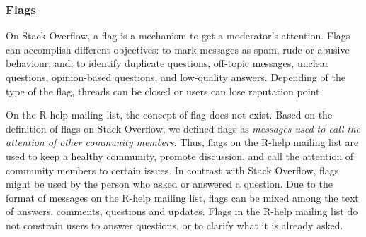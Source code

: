 \documentclass{sig-alternate-05-2015}
\begin{document}

\subsubsection{Flags}

	On Stack Overflow, a flag is a mechanism to get a moderator's attention.
	Flags can accomplish different objectives: to mark messages as spam, rude or abusive behaviour; and, to identify duplicate questions, off-topic messages, unclear questions, opinion-based questions, and low-quality answers.
	Depending of the type of the flag, threads can be closed or users can lose reputation point.


On the R-help mailing list, the concept of flag does not exist. 
Based on the definition of flags on Stack Overflow, we defined flags as \emph{messages used to call the attention of other community members}.
Thus, flags on the R-help mailing list are used to keep a healthy community, promote discussion, and call the attention of community members to certain issues.
In contrast with Stack Overflow, flags might be used by the person who asked or answered a question.
Due to the format of messages on the R-help mailing list, flags can be mixed among the text of answers, comments, questions and updates.
	Flags in the R-help mailing list do not constrain users to answer questions, or to clarify what it is already asked.
\end{document}
